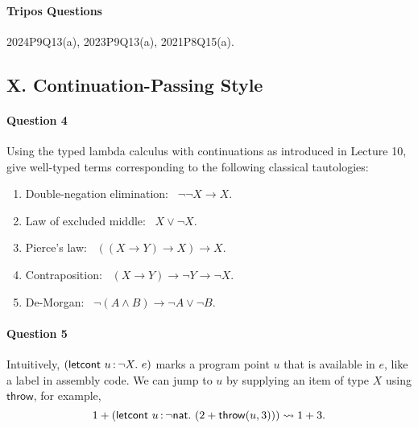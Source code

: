 \documentclass[11pt,a4paper,twoside]{article}
\begin{document}
\paragraph{Tripos Questions} 2024P9Q13(a), 2023P9Q13(a), 2021P8Q15(a).

\subsection*{X. Continuation-Passing Style}

\paragraph{Question 4} Using the typed lambda calculus with continuations as introduced in Lecture 10,
give well-typed terms corresponding to the following classical tautologies:

\begin{enumerate}[label=(\alph*)]
  \item Double-negation elimination: \ $\neg\neg X \to X$.

  \item Law of excluded middle: \ $X \lor \neg X$.   

  \item Pierce's law: \ $((X \to Y) \to X) \to X$.

  \item Contraposition: \ $(X \to Y) \to \neg Y \to \neg X$.

  \item De-Morgan: \ $\neg(A \land B) \to \neg A \lor \neg B$.
\end{enumerate}

\paragraph{Question 5} 
Intuitively, $(\mathsf{letcont}\ \var{u}{\neg X}.\ e)$ marks a program point $u$ that is available in $e$,
like a label in assembly code.
We can jump to $u$ by supplying an item of type $X$ using $\mathsf{throw}$, for example,
  \[ 
    1 + (\mathsf{letcont}\ \var{u}{\neg \mathsf{nat}}.\ (2 + \mathsf{throw}(u, 3)))
      \rightsquigarrow
    1 + 3.
  \]
  
\end{document}
